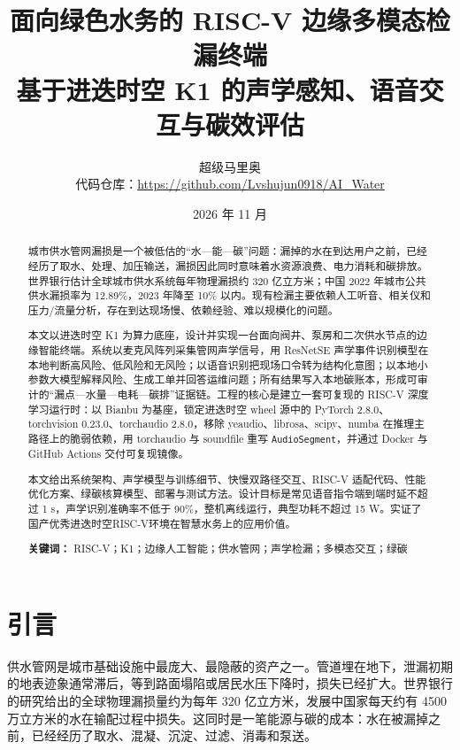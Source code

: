 \documentclass[UTF8,11pt,a4paper,fontset=none]{ctexart}
\title{\bfseries 面向绿色水务的 RISC-V 边缘多模态检漏终端\\[0.4em]
\large 基于进迭时空 K1 的声学感知、语音交互与碳效评估}
\author{超级马里奥\\
\small 代码仓库：\url{https://github.com/Lvshujun0918/AI_Water}}
\date{2026 年 11 月}
\begin{document}
\maketitle
\thispagestyle{plain}

\begin{abstract}
{
\noindent
城市供水管网漏损是一个被低估的“水—能—碳”问题：漏掉的水在到达用户之前，已经经历了取水、处理、加压输送，漏损因此同时意味着水资源浪费、电力消耗和碳排放。世界银行估计全球城市供水系统每年物理漏损约 320 亿立方米\cite{worldbank}；中国 2022 年城市公共供水漏损率为 12.89\%，2023 年降至 10\% 以内\cite{pingdingshan,gmw}。现有检漏主要依赖人工听音、相关仪和压力/流量分析，存在到达现场慢、依赖经验、难以规模化的问题。

本文以进迭时空 K1 为算力底座，设计并实现一台面向阀井、泵房和二次供水节点的边缘智能终端。系统以麦克风阵列采集管网声学信号，用 ResNetSE 声学事件识别模型在本地判断高风险、低风险和无风险；以语音识别把现场口令转为结构化意图；以本地小参数大模型解释风险、生成工单并回答运维问题；所有结果写入本地碳账本，形成可审计的“漏点—水量—电耗—碳排”证据链。工程的核心是建立一套可复现的 RISC-V 深度学习运行时：以 Bianbu 为基座，锁定进迭时空 wheel 源中的 PyTorch 2.8.0、torchvision 0.23.0、torchaudio 2.8.0，移除 yeaudio、librosa、scipy、numba 在推理主路径上的脆弱依赖，用 torchaudio 与 soundfile 重写 \texttt{AudioSegment}，并通过 Docker 与 GitHub Actions 交付可复现镜像。

本文给出系统架构、声学模型与训练细节、快慢双路径交互、RISC-V 适配代码、性能优化方案、绿碳核算模型、部署与测试方法。设计目标是常见语音指令端到端时延不超过 1 s，声学识别准确率不低于 90\%，整机离线运行，典型功耗不超过 15 W。实证了国产优秀进迭时空RISC-V环境在智慧水务上的应用价值。

\vspace{0.8em}
\noindent\textbf{关键词：} RISC-V；K1；边缘人工智能；供水管网；声学检漏；多模态交互；绿碳
}
\end{abstract}

\section{引言}
\label{sec:intro}

供水管网是城市基础设施中最庞大、最隐蔽的资产之一。管道埋在地下，泄漏初期的地表迹象通常滞后，等到路面塌陷或居民水压下降时，损失已经扩大。世界银行的研究给出的全球物理漏损量约为每年 320 亿立方米，发展中国家每天约有 4500 万立方米的水在输配过程中损失\cite{worldbank}。这同时是一笔能源与碳的成本：水在被漏掉之前，已经经历了取水、混凝、沉淀、过滤、消毒和泵送。
\end{document}
